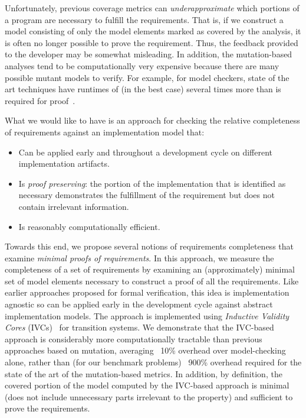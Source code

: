 Unfortunately, previous coverage metrics can {\em underapproximate} which portions of a program are necessary to fulfill the requirements.  That is, if we construct a model consisting of only the model elements marked as covered by the analysis, it is often no longer possible to prove the requirement.  Thus, the feedback provided to the developer may be somewhat misleading.
In addition, the mutation-based analyses tend to be computationally very expensive because there are many possible mutant models to verify.  For example, for model checkers, state of the art techniques have runtimes of (in the best case) several times more than is required for proof~\cite{chockler2010coverage}.

What we would like to have is an approach for checking the relative completeness of requirements against an implementation model that:
\begin{itemize}
    \item Can be applied early and throughout a development cycle on different implementation artifacts.
    \item Is {\em proof preserving}: the portion of the implementation that is identified as necessary demonstrates the
        fulfillment of the requirement but does not contain irrelevant information.
    \item Is reasonably computationally efficient.
\end{itemize}

\noindent Towards this end, we propose several notions of requirements completeness that examine {\em minimal proofs of requirements}.  In this approach, we measure the completeness of a set of requirements by examining an (approximately) minimal set of model elements necessary to construct a proof of all the requirements.  Like earlier approaches proposed for formal verification, this idea is implementation agnostic so can be applied early in the development cycle against abstract implementation models.  The approach is implemented using {\em Inductive Validity Cores} (IVCs)~\cite{Ghass16} for transition systems.  We demonstrate that the IVC-based approach is considerably more computationally tractable than previous approaches based on mutation, averaging ~10\% overhead over model-checking alone, rather than (for our benchmark problems) ~900\% overhead required for the state of the art of the mutation-based metrics.  In addition, by definition, the covered portion of the model computed by the IVC-based approach is minimal (does not include unnecessary parts irrelevant to the property) and sufficient to prove the requirements.

